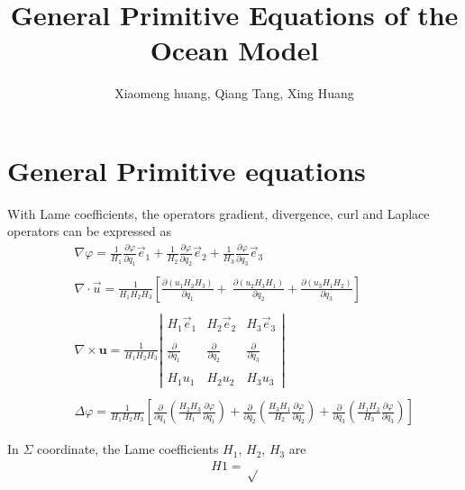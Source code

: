 \documentclass[oribibl]{llncs}
\begin{document}
\title{General Primitive Equations of the Ocean Model}
\author{Xiaomeng huang, Qiang Tang, Xing Huang}

\section{General Primitive equations}
With Lame coefficients, the operators gradient, divergence, curl and Laplace operators can be expressed as
\begin{eqnarray*}
&&\nabla \varphi = \frac{1}{H_1} \frac{\partial \varphi}{\partial q_1} \vec{e}_1+ \frac{1}{H_2} \frac{\partial \varphi}{\partial q_2}\vec{e}_2+\frac{1}{H_3} \frac{\partial \varphi}{\partial q_3} \vec{e}_3 \\ \nonumber \\ 
&&\nabla \cdot \vec{u} = \frac{1}{H_1H_2H_3}\left[ \frac{\partial (u_1H_2H_3)}{\partial q_1} +  \ \frac{\partial (u_2H_3H_1)}{\partial q_2} + \frac{\partial (u_3H_1H_2)}{\partial q_3}  \right] \\ \nonumber \\
&&\nabla \times \textbf{u} =
\frac{1}{H_1H_2H_3}\left|                
  \begin{array}{lll}  
   H_1\vec{e}_1    & H_2\vec{e}_2   & H_3\vec{e}_3 \\  \\  
   \frac{\partial}{\partial q_1}   &   \frac{\partial}{\partial q_2} & \frac{\partial}{\partial q_3}\\  \\ 
   H_1 u_1     & H_2 u_2     & H_3 u_3
  \end{array}\right| \\ \nonumber \\
&&\Delta \varphi=\frac{1}{H_1 H_2 H_3} \left[ \frac{\partial}{\partial q_1}\left( \frac{H_2H_3}{H_1} \frac{\partial \varphi}{\partial q_1} \right) +\frac{\partial}{\partial q_2}\left( \frac{H_3H_1}{H_2} \frac{\partial \varphi}{\partial q_2} \right) +\frac{\partial}{\partial q_3}\left( \frac{H_1H_2}{H_3} \frac{\partial \varphi}{\partial q_3} \right) \right]  
\end{eqnarray*}

In $\Sigma$ coordinate, the Lame coefficients $H_1$, $H_2$, $H_3$ are
\begin{eqnarray*}
H1=\sqrt
\end{eqnarray*}
\end{document}
